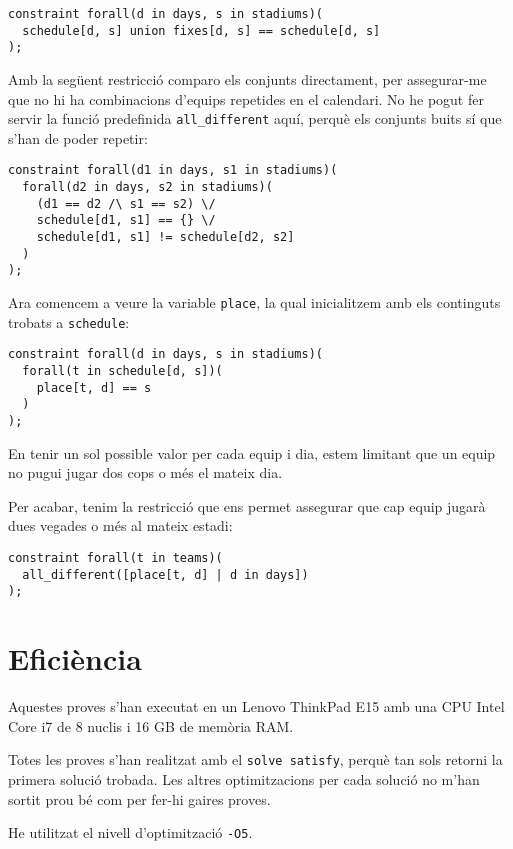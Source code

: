 \documentclass{article}
\begin{document}
\begin{verbatim}
constraint forall(d in days, s in stadiums)(
  schedule[d, s] union fixes[d, s] == schedule[d, s]
);
\end{verbatim}

Amb la següent restricció comparo els conjunts directament, per assegurar-me que
no hi ha combinacions d'equips repetides en el calendari. No he pogut fer servir
la funció predefinida \texttt{all\_different} aquí, perquè els conjunts buits sí
que s'han de poder repetir:

\begin{verbatim}
constraint forall(d1 in days, s1 in stadiums)(
  forall(d2 in days, s2 in stadiums)(
    (d1 == d2 /\ s1 == s2) \/
    schedule[d1, s1] == {} \/
    schedule[d1, s1] != schedule[d2, s2]
  )
);
\end{verbatim}

Ara comencem a veure la variable \texttt{place}, la qual inicialitzem amb els
continguts trobats a \texttt{schedule}:

\begin{verbatim}
constraint forall(d in days, s in stadiums)(
  forall(t in schedule[d, s])(
    place[t, d] == s
  )
);
\end{verbatim}

En tenir un sol possible valor per cada equip i dia, estem limitant que un equip
no pugui jugar dos cops o més el mateix dia.

Per acabar, tenim la restricció que ens permet assegurar que cap equip jugarà
dues vegades o més al mateix estadi:

\begin{verbatim}
constraint forall(t in teams)(
  all_different([place[t, d] | d in days])
);
\end{verbatim}

\section{Eficiència}

Aquestes proves s'han executat en un Lenovo ThinkPad E15 amb una CPU Intel Core
i7 de 8 nuclis i 16 GB de memòria RAM.

Totes les proves s'han realitzat amb el \texttt{solve satisfy}, perquè tan sols
retorni la primera solució trobada. Les altres optimitzacions per cada solució
no m'han sortit prou bé com per fer-hi gaires proves.

He utilitzat el nivell d'optimització \texttt{-O5}.
\end{document}
